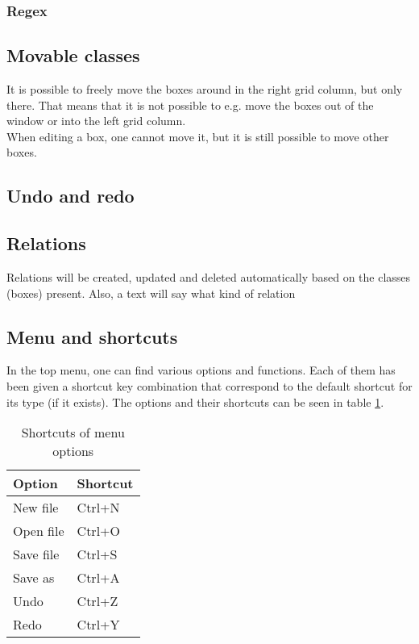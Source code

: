 \subsubsection{Regex}

\subsection{Movable classes}

It is possible to freely move the boxes around in the right grid column, but only there. That means that it is not possible to e.g. move the boxes out of the window or into the left grid column.\\
When editing a box, one cannot move it, but it is still possible to move other boxes.

\subsection{Undo and redo}

\subsection{Relations}

Relations will be created, updated and deleted automatically based on the classes (boxes) present. Also, a text will say what kind of relation

\subsection{Menu and shortcuts}

In the top menu, one can find various options and functions. Each of them has been given a shortcut key combination that correspond to the default shortcut for its type (if it exists). The options and their shortcuts can be seen in table \ref{tab:menu_shortcut}.

\begin{table}[htbp]
\centering
\begin{tabular}{|l|l|}
\hline
\textbf{Option} & \textbf{Shortcut}\\
\hline
New file & Ctrl+N\\
\hline
Open file & Ctrl+O\\
\hline
Save file & Ctrl+S\\
\hline
Save as & Ctrl+A\\
\hline
Undo & Ctrl+Z\\
\hline
Redo & Ctrl+Y\\
\hline
\end{tabular}
\caption{Shortcuts of menu options}
\label{tab:menu_shortcut}
\end{table}

